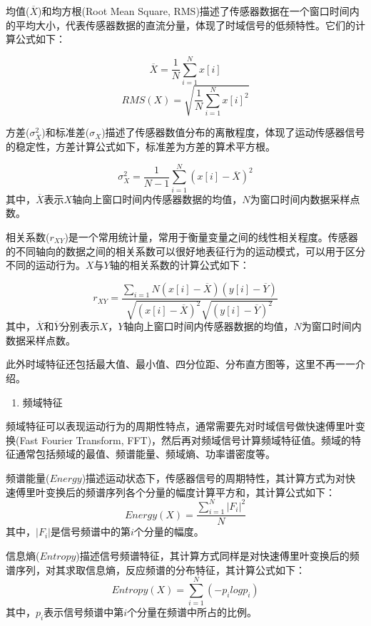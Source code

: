 \par 均值($\overline{X}$)和均方根(Root Mean Square, RMS)描述了传感器数据在一个窗口时间内的平均大小，代表传感器数据的直流分量，体现了时域信号的低频特性。它们的计算公式如下：

\begin{equation}
	\overline{X} = \frac{1}{N}\sum_{i=1}^{N}x[i]
\end{equation}
\begin{equation}
	RMS(X) = \sqrt{\frac{1}{N}\sum_{i=1}^{N}x[i]^2}
\end{equation}
\par 方差($\sigma_X^2$)和标准差($\sigma_X$)描述了传感器数值分布的离散程度，体现了运动传感器信号的稳定性，方差计算公式如下，标准差为方差的算术平方根。

\begin{equation}
	\sigma_X^2 = \frac{1}{N-1}\sum_{i=1}^{N}(x[i]-\overline{X})^2
\end{equation}
其中，$\overline{X}$表示$X$轴向上窗口时间内传感器数据的均值，$N$为窗口时间内数据采样点数。
\par 相关系数($r_{XY}$)是一个常用统计量，常用于衡量变量之间的线性相关程度。传感器的不同轴向的数据之间的相关系数可以很好地表征行为的运动模式，可以用于区分不同的运动行为。$X$与$Y$轴的相关系数的计算公式如下：

\begin{equation}
	r_{XY} = \frac{\sum_{i=1}{N}(x[i] - \overline{X})(y[i] - \overline{Y})}{\sqrt{(x[i] - \overline{X})^2}\sqrt{(y[i] - \overline{Y})^2}}
\end{equation}
其中，$\overline{X}$和$\overline{Y}$分别表示$X$，$Y$轴向上窗口时间内传感器数据的均值，$N$为窗口时间内数据采样点数。
\par 此外时域特征还包括最大值、最小值、四分位距、分布直方图等，这里不再一一介绍。

\begin{enumerate}[(2)]
	\item 频域特征
\end{enumerate}
\par 频域特征可以表现运动行为的周期性特点，通常需要先对时域信号做快速傅里叶变换(Fast Fourier Transform, FFT)，然后再对频域信号计算频域特征值。频域的特征通常包括频域的最值、频谱能量、频域熵、功率谱密度等。
\par 频谱能量($Energy$)描述运动状态下，传感器信号的周期特性，其计算方式为对快速傅里叶变换后的频谱序列各个分量的幅度计算平方和，其计算公式如下：
\begin{equation}
	Energy(X) = \frac{\sum_{i=1}^{N}|F_i|^2}{N}
\end{equation}
其中，$|F_i|$是信号频谱中的第$i$个分量的幅度。
\par 信息熵($Entropy$)描述信号频谱特征，其计算方式同样是对快速傅里叶变换后的频谱序列，对其求取信息熵，反应频谱的分布特征，其计算公式如下：
\begin{equation}
	Entropy(X) = \sum_{i=1}^{N}(-p_ilogp_i)
\end{equation}
其中，$p_i$表示信号频谱中第$i$个分量在频谱中所占的比例。
